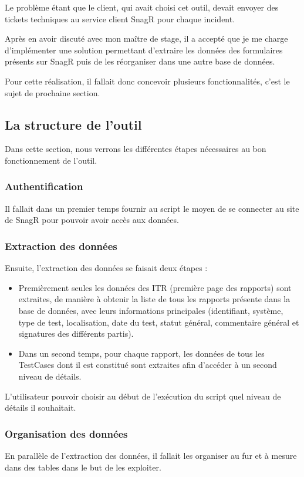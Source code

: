 Le problème étant que le client, qui avait choisi cet outil, devait envoyer des tickets techniques au service client \gls{SnagR} pour chaque incident.

Après en avoir discuté avec mon maître de stage, il a accepté que je me charge d'implémenter une solution permettant d'extraire les données des formulaires présents sur \gls{SnagR} puis de les réorganiser dans une autre base de données.

Pour cette réalisation, il fallait donc concevoir plusieurs fonctionnalités, c'est le sujet de prochaine section.

\subsection{La structure de l'outil}

Dans cette section, nous verrons les différentes étapes nécessaires au bon fonctionnement de l'outil.

\subsubsection{Authentification}
Il fallait dans un premier temps fournir au script le moyen de se connecter au site de \gls{SnagR} pour pouvoir avoir accès aux données.
\subsubsection{Extraction des données}
Ensuite, l'extraction des données se faisait deux étapes :
\begin{itemize}
\item Premièrement seules les données des ITR (première page des rapports) sont extraites, de manière à obtenir la liste de tous les rapports présente dans la base de données, avec leurs informations principales (identifiant, système, type de test, localisation, date du test, statut général, commentaire général et signatures des différents partis).
\item Dans un second temps, pour chaque rapport, les données de tous les \gls{TestCases} dont il est constitué sont extraites afin d'accéder à un second niveau de détails.
\end{itemize}

L'utilisateur pouvoir choisir au début de l'exécution du script quel niveau de détails il souhaitait.
\subsubsection{Organisation des données}
En parallèle de l'extraction des données, il fallait les organiser au fur et à mesure dans des tables dans le but de les exploiter.
